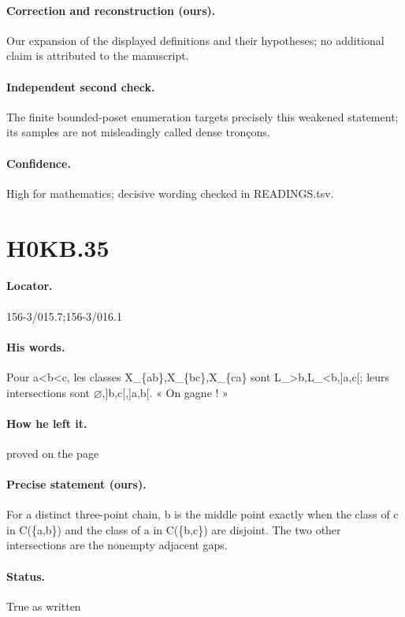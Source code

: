 \paragraph{Correction and reconstruction (ours).} Our expansion of the displayed definitions and their hypotheses; no additional claim is attributed to the manuscript.

\paragraph{Independent second check.} The finite bounded-poset enumeration targets precisely this weakened statement; its samples are not misleadingly called dense tronçons.

\paragraph{Confidence.} High for mathematics; decisive wording checked in READINGS.tsv.

\section*{H0KB.35}\label{statement:H0KB.35}
\paragraph{Locator.} 156-3/015.7;156-3/016.1

\paragraph{His words.} Pour a<b<c, les classes X\_\{ab\},X\_\{bc\},X\_\{ca\} sont L\_>b,L\_<b,]a,c[; leurs intersections sont \ensuremath{\varnothing},]b,c[,]a,b[. « On gagne ! »

\paragraph{How he left it.} proved on the page

\paragraph{Precise statement (ours).} For a distinct three-point chain, b is the middle point exactly when the class of c in C(\{a,b\}) and the class of a in C(\{b,c\}) are disjoint. The two other intersections are the nonempty adjacent gaps.

\paragraph{Status.} True as written

